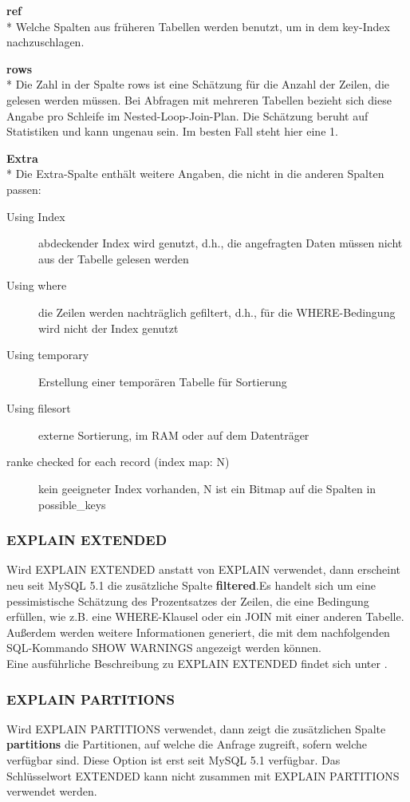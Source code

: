 \textbf{ref}\\*
Welche Spalten aus früheren Tabellen werden benutzt, um in dem key-Index nachzuschlagen.

\textbf{rows}\\*
Die Zahl in der Spalte rows ist eine Schätzung für die Anzahl der Zeilen, die gelesen werden müssen.
Bei Abfragen mit mehreren Tabellen bezieht sich diese Angabe pro Schleife im Nested-Loop-Join-Plan.
Die Schätzung beruht auf Statistiken und kann ungenau sein. Im besten Fall steht hier eine 1.

\textbf{Extra}\\*
Die Extra-Spalte enthält weitere Angaben, die nicht in die anderen Spalten passen:
\begin{description}
\item[Using Index] abdeckender Index wird genutzt, d.h., die angefragten Daten müssen nicht aus der Tabelle gelesen werden
\item[Using where] die Zeilen werden nachträglich gefiltert, d.h., für die WHERE-Bedingung wird nicht der Index genutzt
\item[Using temporary] Erstellung einer temporären Tabelle für Sortierung 
\item[Using filesort] externe Sortierung, im RAM oder auf dem Datenträger
\item[ranke checked for each record (index map: N)] kein geeigneter Index vorhanden, N ist ein Bitmap auf die Spalten in possible\_keys
\end{description}

\subsubsection{EXPLAIN EXTENDED}
Wird EXPLAIN EXTENDED anstatt von EXPLAIN verwendet, dann erscheint neu seit MySQL 5.1 die zusätzliche Spalte \textbf{filtered}.Es handelt sich um eine pessimistische Schätzung des Prozentsatzes der Zeilen, die eine Bedingung erfüllen, wie z.B. eine WHERE-Klausel oder ein JOIN mit einer anderen Tabelle.
Außerdem werden weitere Informationen generiert, die mit dem nachfolgenden SQL-Kommando SHOW WARNINGS angezeigt werden können.\\
Eine ausführliche Beschreibung zu EXPLAIN EXTENDED findet sich unter \cite{refman3}.

\subsubsection{EXPLAIN PARTITIONS}
Wird EXPLAIN PARTITIONS verwendet, dann zeigt die zusätzlichen Spalte \textbf{partitions} die Partitionen, auf welche die Anfrage zugreift, sofern welche verfügbar sind. Diese Option ist erst seit MySQL 5.1 verfügbar.
Das Schlüsselwort EXTENDED kann nicht zusammen mit EXPLAIN PARTITIONS verwendet werden.

